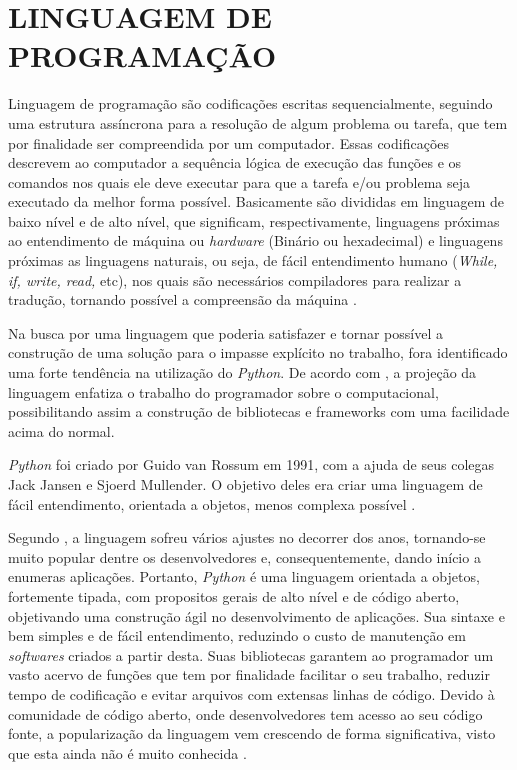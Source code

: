 \section{{LINGUAGEM DE PROGRAMAÇÃO}}

Linguagem de programação são codificações escritas sequencialmente, seguindo uma estrutura assíncrona para a resolução de algum problema ou tarefa, que tem por finalidade ser compreendida por um computador. Essas codificações descrevem ao computador a sequência lógica de execução das funções e os comandos nos quais ele deve executar para que a tarefa e/ou problema seja executado da melhor forma possível. Basicamente são divididas em linguagem de baixo nível e de alto nível, que significam, respectivamente, linguagens próximas ao entendimento de máquina ou \textit{hardware} (Binário ou hexadecimal) e linguagens próximas as linguagens naturais, ou seja, de fácil entendimento humano (\textit{While, if, write, read,} etc), nos quais são necessários compiladores para realizar a tradução, tornando possível a compreensão da máquina \cite{KELLEHER2005}.

Na busca por uma linguagem que poderia satisfazer e tornar possível a construção de uma solução para o impasse explícito no trabalho, fora identificado uma forte tendência na utilização do \textit{Python}. De acordo com , a projeção da linguagem enfatiza o trabalho do programador sobre o computacional, possibilitando assim a construção de bibliotecas e frameworks com uma facilidade acima do normal.

\textit{Python} foi criado por Guido van Rossum em 1991, com a ajuda de seus colegas Jack Jansen e Sjoerd Mullender. O objetivo deles era criar uma linguagem de fácil entendimento, orientada a objetos, menos complexa possível \cite{SONGINI2005}.

Segundo , a linguagem sofreu vários ajustes no decorrer dos anos, tornando-se muito popular dentre os desenvolvedores e, consequentemente, dando início a enumeras aplicações. Portanto, \textit{Python} é uma linguagem orientada a objetos, fortemente tipada, com propositos gerais de alto nível e de código aberto, objetivando uma construção ágil no desenvolvimento de aplicações. Sua sintaxe e bem simples e de fácil entendimento, reduzindo o custo de manutenção em \textit{softwares} criados a partir desta. Suas bibliotecas garantem ao programador um vasto acervo de funções que tem por finalidade facilitar o seu trabalho, reduzir tempo de codificação e evitar arquivos com extensas linhas de código. Devido à comunidade de código aberto, onde desenvolvedores tem acesso ao seu código fonte, a popularização da linguagem vem crescendo de forma significativa, visto que esta ainda não é muito conhecida \cite{SONGINI2005}.